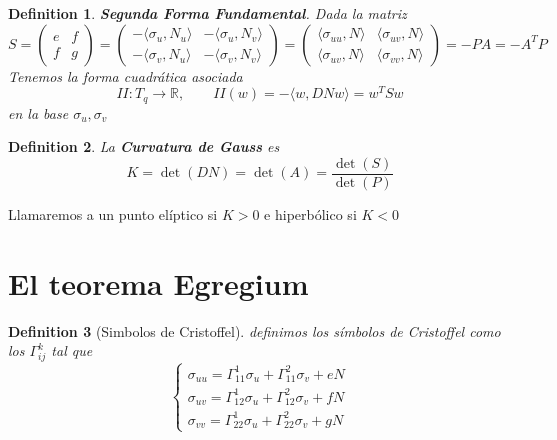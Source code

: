 \documentclass[leqno]{article}
\newtheorem*{definition}{Definition}
\begin{document}
\begin{definition}
\textbf{Segunda Forma Fundamental}. Dada la matriz
\[
  S = \begin{pmatrix} e & f \\ f & g \end{pmatrix} = \begin{pmatrix} -\langle \sigma _u , N_u \rangle & -\langle \sigma _u , N_v \rangle \\ -\langle \sigma _v , N_u \rangle & -\langle \sigma _v , N_v \rangle   \end{pmatrix} =   \begin{pmatrix} \langle \sigma _{uu} , N \rangle & \langle \sigma _{uv} , N \rangle \\ \langle \sigma _{uv} , N \rangle & \langle \sigma _{vv} , N \rangle   \end{pmatrix} =  -PA = -A^TP 
\] 
Tenemos la forma cuadrática asociada
\[
II: T_q\to \mathbb{R}, \qquad II(w) = -\langle w , DNw \rangle = w^TSw
\] 
en la base $\sigma _u, \sigma _v$
\end{definition}

\begin{definition}
La \textbf{Curvatura de Gauss} es
\[
K = \det(DN) = \det(A) = \frac{\det(S)}{\det(P)}
\] 
\end{definition}
Llamaremos a un punto elíptico si $K>0$ e hiperbólico si $K<0$


\section{El teorema Egregium}
\begin{definition}[Simbolos de Cristoffel]
  definimos los símbolos de Cristoffel como los $\Gamma_{ij}^k$ tal que
  \[
  \begin{cases}
    \sigma _{uu} = \Gamma_{11}^1\sigma _u + \Gamma_{11}^2 \sigma _v + eN \\
    \sigma _{uv} = \Gamma_{12}^1\sigma _u + \Gamma_{12}^2 \sigma _v + fN \\
    \sigma _{vv} = \Gamma_{22}^1\sigma _u + \Gamma_{22}^2 \sigma _v + gN
  \end{cases}
  \] 
\end{definition}
\end{document}
